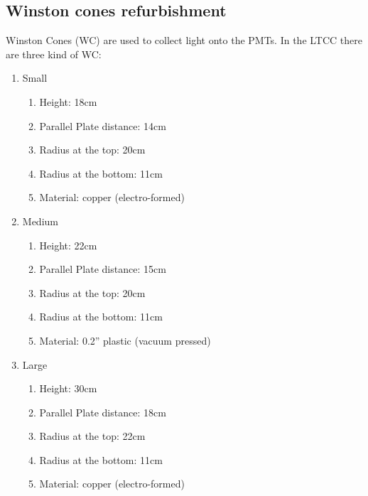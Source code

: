 \subsection{Winston cones refurbishment}

Winston Cones (WC) are used to collect light onto the PMTs. In the LTCC there are three kind of WC:

\begin{enumerate}

\item Small
	\begin{enumerate}
		\item Height: 18cm
		\item Parallel Plate distance: 14cm
		\item Radius at the top: 20cm
		\item Radius at the bottom: 11cm
		\item Material: copper (electro-formed)
	\end{enumerate}

	\item Medium
	\begin{enumerate}
		\item Height: 22cm
		\item Parallel Plate distance: 15cm
		\item Radius at the top: 20cm
		\item Radius at the bottom: 11cm
		\item Material: 0.2” plastic (vacuum pressed)
	\end{enumerate}

	\item Large
	\begin{enumerate}
		\item Height: 30cm
		\item Parallel Plate distance: 18cm
		\item Radius at the top: 22cm
		\item Radius at the bottom: 11cm
		\item Material: copper (electro-formed)
	\end{enumerate}
\end{enumerate}

